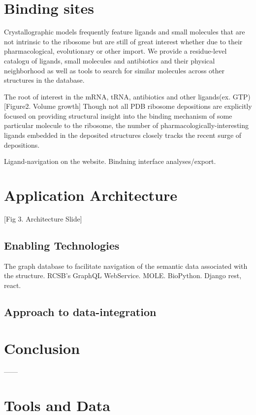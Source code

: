 \documentclass[11pt]{article}
\begin{document}
\section{Binding sites}

Crystallographic models frequently feature ligands and small molecules that are not intrinsic to the ribosome but are still of great interest whether due to their pharmacological, evolutionary or other import. We provide a residue-level catalogu of ligands, small molecules and antibiotics and their physical neighborhood as well as tools to search for similar molecules across other structures in the database.


The root of interest in the mRNA, tRNA, antibiotics and other ligands(ex. GTP)
[Figure2. Volume growth] 
Though not all PDB ribosome depositions are explicitly focused on providing structural insight into the binding mechanism of some particular molecule to the ribosome, the number of pharmacologically-interesting ligands embedded in the deposited structures closely tracks the recent surge of depositions.  

Ligand-navigation on the website. Bindning interface analyses/export.




\section{Application Architecture}
[Fig 3. Architecture Slide]
\subsection{Enabling Technologies}

The graph database to facilitate navigation of the semantic data associated with the structure. RCSB's GraphQL WebService. MOLE. BioPython. Django rest, react.
\subsection{Approach to data-integration}


\section{Conclusion}

------


\section{Tools and Data}
\end{document}
